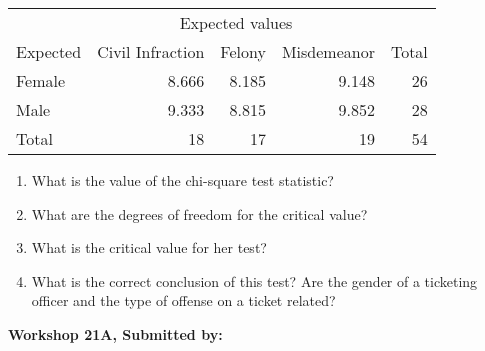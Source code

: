\documentclass[11pt]{book}\usepackage[]{graphicx}\usepackage[]{color}
\begin{document}
\begin{exercises}
\begin{exercise}
\begin{center}
\begin{tabular}{@{} lrrrr @{}} \hline
 & \multicolumn{3}{c}{Expected values} \\
Expected&	Civil Infraction&	Felony&	Misdemeanor&	Total \\ \hline
Female&	8.666&	8.185&	9.148&	26 \\ \hline
Male&	9.333&	8.815&	9.852&	28 \\ \hline
Total&	18&	17&	19&	54 \\ \hline
\end{tabular}
\end{center}

\begin{enumerate}
  \item What is the value of the chi-square test statistic?
  \item	What are the degrees of freedom for the critical value?
  \item	What is the critical value for her test?
  \item	What is the correct conclusion of this test? Are the gender of a ticketing officer and the type of offense on a ticket related?
\end{enumerate}

\end{exercise}
\begin{solution}  %

\end{solution}

\clearpage

    \begin{exercise}  %

    \begin{center}
\begin{flushleft}\textbf{\large \hfill Workshop 21A, Submitted by: }\end{flushleft}

\end{center}
\end{exercise}
\end{exercises}
\end{document}
